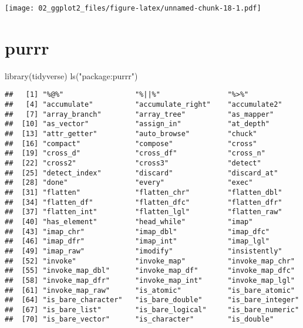 \documentclass[
]{book}
\newenvironment{Shaded}{\begin{snugshade}}{\end{snugshade}}
\newcommand{\FunctionTok}[1]{\textcolor[rgb]{0.00,0.00,0.00}{#1}}
\newcommand{\NormalTok}[1]{#1}
\newcommand{\StringTok}[1]{\textcolor[rgb]{0.31,0.60,0.02}{#1}}
\begin{document}
\texttt{[image: 02\_ggplot2\_files/figure-latex/unnamed-chunk-18-1.pdf]}

\hypertarget{purrr}{%
\chapter{purrr}\label{purrr}}

\begin{Shaded}
\begin{Highlighting}[]
\FunctionTok{library}\NormalTok{(tidyverse)}
\FunctionTok{ls}\NormalTok{(}\StringTok{"package:purrr"}\NormalTok{)}
\end{Highlighting}
\end{Shaded}

\begin{verbatim}
##   [1] "%@%"                 "%||%"                "%>%"                
##   [4] "accumulate"          "accumulate_right"    "accumulate2"        
##   [7] "array_branch"        "array_tree"          "as_mapper"          
##  [10] "as_vector"           "assign_in"           "at_depth"           
##  [13] "attr_getter"         "auto_browse"         "chuck"              
##  [16] "compact"             "compose"             "cross"              
##  [19] "cross_d"             "cross_df"            "cross_n"            
##  [22] "cross2"              "cross3"              "detect"             
##  [25] "detect_index"        "discard"             "discard_at"         
##  [28] "done"                "every"               "exec"               
##  [31] "flatten"             "flatten_chr"         "flatten_dbl"        
##  [34] "flatten_df"          "flatten_dfc"         "flatten_dfr"        
##  [37] "flatten_int"         "flatten_lgl"         "flatten_raw"        
##  [40] "has_element"         "head_while"          "imap"               
##  [43] "imap_chr"            "imap_dbl"            "imap_dfc"           
##  [46] "imap_dfr"            "imap_int"            "imap_lgl"           
##  [49] "imap_raw"            "imodify"             "insistently"        
##  [52] "invoke"              "invoke_map"          "invoke_map_chr"     
##  [55] "invoke_map_dbl"      "invoke_map_df"       "invoke_map_dfc"     
##  [58] "invoke_map_dfr"      "invoke_map_int"      "invoke_map_lgl"     
##  [61] "invoke_map_raw"      "is_atomic"           "is_bare_atomic"     
##  [64] "is_bare_character"   "is_bare_double"      "is_bare_integer"    
##  [67] "is_bare_list"        "is_bare_logical"     "is_bare_numeric"    
##  [70] "is_bare_vector"      "is_character"        "is_double"          

\end{verbatim}
\end{document}
